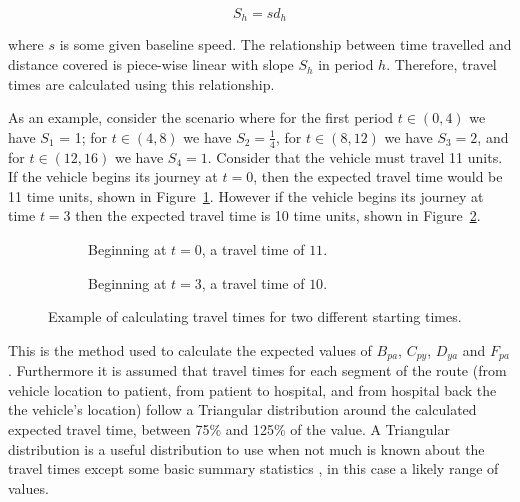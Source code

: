 \documentclass[numbers,webpdf,imaman]{ima-authoring-template}%
\begin{document}
\begin{equation}\label{eqn:speed}
S_h = s d_h
\end{equation}

\noindent
where $s$ is some given baseline speed. The relationship between time travelled
and distance covered is piece-wise linear with slope $S_h$ in period $h$.
Therefore, travel times are calculated using this relationship.

As an example, consider the scenario where for the first period $t \in (0, 4)$
we have $S_1$ = 1; for $t \in (4, 8)$ we have $S_2 = \frac{1}{4}$, for
$t \in (8, 12)$ we have $S_3 = 2$, and for $t \in (12, 16)$ we have $S_4 = 1$.
Consider that the vehicle must travel 11 units. If the vehicle begins its
journey at $t=0$, then the expected travel time would be 11 time units, shown
in Figure~\ref{fig:travel_times_1}. However if the vehicle begins its journey
at time $t=3$ then the expected travel time is 10 time units, shown in
Figure~\ref{fig:travel_times_2}.

\begin{figure}
    \begin{center}
    \begin{subfigure}{6.6cm}
    
    \caption{Beginning at $t=0$, a travel time of $11$.}
    \label{fig:travel_times_1}
    \end{subfigure}
    \begin{subfigure}{6.6cm}
    
    \caption{Beginning at $t=3$, a travel time of $10$.}
    \label{fig:travel_times_2}
    \end{subfigure}
    \end{center}
    \caption{Example of calculating travel times for two different starting
    times.}
    \label{fig:travel_times}
\end{figure}

This is the method used to calculate the expected values of $B_{pa}$, $C_{py}$,
$D_{ya}$ and $F_{pa}$.
Furthermore it is assumed that travel times for each segment of the route
(from vehicle location to patient, from patient to hospital, and from hospital
back the the vehicle's location) follow a Triangular distribution around the
calculated expected travel time, between 75\% and 125\% of the value.
A Triangular distribution is a useful distribution to use when
not much is known about the travel times except some basic summary statistics
\citep{robinson2014simulation}, in this case a likely range of values.
\end{document}
